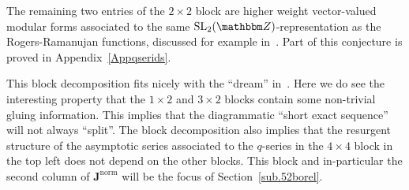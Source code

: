 \documentclass[12pt,reqno]{amsart}
\theoremstyle{definition}
\newtheorem{corollary}[theorem]{Corollary}
\def\BZ{\mathbbm Z}
\def\SL{\mathrm{SL}}
\def\be{\begin{equation}}
\def\ee{\end{equation}}
\def\bJ{\mathbf J}
\def\DS{Q} %
\begin{document}
The remaining two entries of the $2 \times 2$ block are higher weight vector-valued
modular forms associated to the same $\SL_{2}(\BZ)$-representation as the
Rogers-Ramanujan functions, discussed for example in~\cite{SW:NCJac}. Part of this
conjecture is proved in Appendix~\ref{Appqserids}.

This block decomposition fits nicely with the ``dream''
in~\cite{DZ:lec}. Here we do see the interesting property that the
$1\times 2$ and $3\times 2$ blocks contain some non-trivial gluing
information. This implies that the diagrammatic ``short exact
sequence'' will not always ``split''.  The block decomposition also
implies that the resurgent structure of the asymptotic series
associated to the $q$-series in the $4\times4$ block in the top left
does not depend on the other blocks. This block and in-particular the
second column of $\bJ^{\mathrm{norm}}$ will be the focus of
Section~\ref{sub.52borel}.
\end{document}
